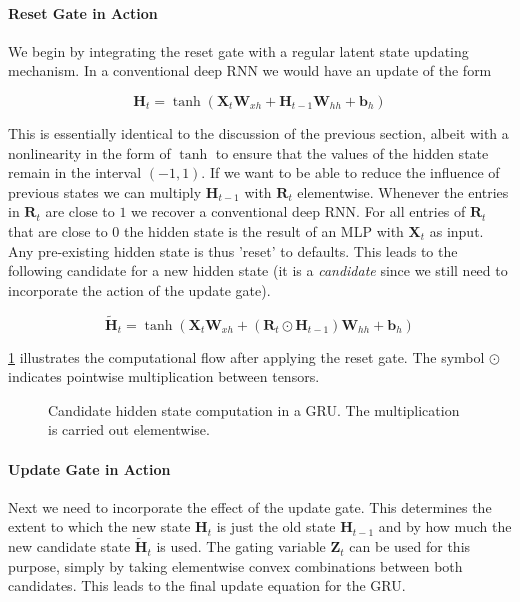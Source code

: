 \paragraph{Reset Gate in Action}

We begin by integrating the reset gate with a regular latent state updating mechanism. In a conventional deep RNN we would have an update of the form

$$\mathbf{H}_t = \tanh(\mathbf{X}_t \mathbf{W}_{xh} + \mathbf{H}_{t-1}\mathbf{W}_{hh} + \mathbf{b}_h)$$

This is essentially identical to the discussion of the previous section, albeit with a nonlinearity in the form of $\tanh$ to ensure that the values of the hidden state remain in the interval $(-1, 1)$.
If we want to be able to reduce the influence of previous states we can multiply $\mathbf{H}_{t-1}$ with $\mathbf{R}_t$ elementwise. Whenever the entries in $\mathbf{R}_t$ are close to $1$ we recover a conventional deep RNN. For all entries of $\mathbf{R}_t$ that are close to $0$ the hidden state is the result of an MLP with $\mathbf{X}_t$ as input. Any pre-existing hidden state is thus 'reset' to defaults. This leads to the following candidate for a new hidden state (it is a \textit{candidate} since we still need to incorporate the action of the update gate).

$$\tilde{\mathbf{H}}_t = \tanh(\mathbf{X}_t \mathbf{W}_{xh} + \left(\mathbf{R}_t \odot \mathbf{H}_{t-1}\right) \mathbf{W}_{hh} + \mathbf{b}_h)$$

\cref{fig:gru_2} illustrates the computational flow after applying the reset gate. The symbol $\odot$ indicates pointwise multiplication between tensors.

\begin{figure}[hpt]
	\centering
	
	\caption{Candidate hidden state computation in a GRU. The multiplication is carried out elementwise.}
	\label{fig:gru_2}
\end{figure}

\paragraph{Update Gate in Action}

Next we need to incorporate the effect of the update gate. This determines the extent to which the new state $\mathbf{H}_t$ is just the old state $\mathbf{H}_{t-1}$ and by how much the new candidate state $\tilde{\mathbf{H}}_t$ is used. The gating variable $\mathbf{Z}_t$ can be used for this purpose, simply by taking elementwise convex combinations between both candidates. This leads to the final update equation for the GRU.

